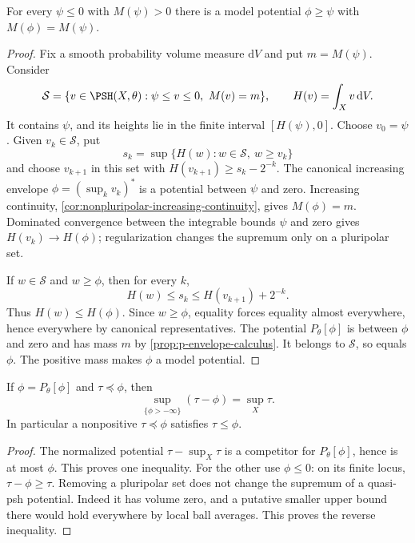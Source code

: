 \begin{lemma}\label{lem:mass-preserving-model-majorant}
For every $\psi\leq0$ with $M(\psi)>0$ there is a model potential $\phi\geq\psi$ with $M(\phi)=M(\psi)$.
\end{lemma}
\begin{proof}
Fix a smooth probability volume measure $\mathrm dV$ and put $m=M(\psi)$. Consider
\[
 \mathcal S=\{v\in\PSH(X,\theta):\psi\leq v\leq0,
                                             \ M(v)=m\},
 \qquad H(v)=\int_Xv\,\mathrm dV.
\]
It contains $\psi$, and its heights lie in the finite interval $[H(\psi),0]$. Choose $v_0=\psi$. Given $v_k\in\mathcal S$, put
\[
 s_k=\sup\{H(w):w\in\mathcal S,\ w\geq v_k\}
\]
and choose $v_{k+1}$ in this set with $H(v_{k+1})\geq s_k-2^{-k}$. The canonical increasing envelope $\phi=(\sup_kv_k)^*$ is a potential between $\psi$ and zero. Increasing continuity, \cref{cor:nonpluripolar-increasing-continuity}, gives $M(\phi)=m$. Dominated convergence between the integrable bounds $\psi$ and zero gives $H(v_k)\to H(\phi)$; regularization changes the supremum only on a pluripolar set.

If $w\in\mathcal S$ and $w\geq\phi$, then for every $k$,
\[
 H(w)\leq s_k\leq H(v_{k+1})+2^{-k}.
\]
Thus $H(w)\leq H(\phi)$. Since $w\geq\phi$, equality forces equality almost everywhere, hence everywhere by canonical representatives. The potential $P_\theta[\phi]$ is between $\phi$ and zero and has mass $m$ by \cref{prop:p-envelope-calculus}. It belongs to $\mathcal S$, so equals $\phi$. The positive mass makes $\phi$ a model potential.
\end{proof}

\begin{lemma}\label{lem:model-normalized-supremum}
If $\phi=P_\theta[\phi]$ and $\tau\preceq\phi$, then
\[
 \sup_{\{\phi> -\infty\}}(\tau-\phi)=\sup_X\tau.
\]
In particular a nonpositive $\tau\preceq\phi$ satisfies $\tau\leq\phi$.
\end{lemma}
\begin{proof}
The normalized potential $\tau-\sup_X\tau$ is a competitor for $P_\theta[\phi]$, hence is at most $\phi$. This proves one inequality. For the other use $\phi\leq0$: on its finite locus, $\tau-\phi\geq\tau$. Removing a pluripolar set does not change the supremum of a quasi-psh potential. Indeed it has volume zero, and a putative smaller upper bound there would hold everywhere by local ball averages. This proves the reverse inequality.
\end{proof}


